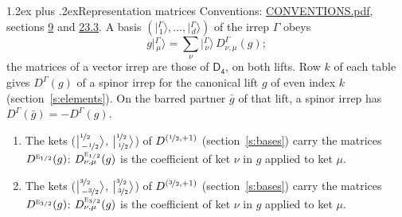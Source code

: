 \documentclass[10pt,a4paper]{article}
\makeatletter
\renewcommand\section{\@startsection{section}{1}{\z@}{-3ex plus -1ex minus -.2ex}%
  {1.2ex plus .2ex}{\normalfont\large\sffamily\bfseries\color{parttitle}}}
\numberwithin{equation}{section}
\newcommand{\grp}[1]{\mathsf{#1}}
\newcommand{\irr}[1]{\text{\normalfont\scshape #1}}
\newcommand{\irrJp}[2]{D^{(#1,#2)}}
\newcommand{\repD}[1]{D^{#1}}
\newcommand{\intx}{\mu}
\newcommand{\jm}[2]{\bigl\lvert{}^{#1}_{\,#2}\bigr\rangle}
\newcommand{\irket}[2]{\bigl\lvert{}^{#1}_{\,#2}\bigr\rangle}
\newcommand{\barred}[1]{\bar{#1}}
\newenvironment{romanlist}{\begin{enumerate}%
\renewcommand{\labelenumi}{(\roman{enumi})}}%
  {\end{enumerate}}
\makeatother
\begin{document}
\section{Representation matrices}\label{s:irrep_matrices}
Conventions: \href{../../CONVENTIONS.pdf}{CONVENTIONS.pdf}, sections \href{../../../rotation/CONVENTIONS.pdf\#conv.9}{9} and \href{../../CONVENTIONS.pdf\#conv.23.3}{23.3}.
\leavevmode\label{n:vector.ket.partner}\label{n:index.partner}\label{n:matrix.irrep}\label{n:index.partner.summed}A basis $(\irket{\Gamma}{1}, \dots, \irket{\Gamma}{d})$ of the irrep $\Gamma$ obeys
\begin{equation}\label{e:partner}g\irket{\Gamma}{\intx} = \sum_\nu \irket{\Gamma}{\nu}\, \repD{\Gamma}_{\nu,\intx}(g);\end{equation}
the matrices of a vector irrep are those of \href{../../../rotation/data/pdf/D4.pdf}{$\grp{D_{4}}$}, on both lifts. Row $k$ of each table gives $\repD{\Gamma}(g)$ of a spinor irrep for the canonical lift $g$ of even index $k$ (section~\ref{s:elements}). On the barred partner $\barred{g}$ of that lift, a spinor irrep has $\repD{\Gamma}(\barred{g}) = -\repD{\Gamma}(g)$.
\begin{romanlist}\raggedright
\item The kets ($\jm{\nicefrac{1}{2}}{-\nicefrac{1}{2}}$, $\jm{\nicefrac{1}{2}}{\nicefrac{1}{2}}$) of $\irrJp{\nicefrac{1}{2}}{+1}$ (section~\ref{s:bases}) carry the matrices $\repD{\irr{e}_{1/2}}(g)$: $\repD{\irr{e}_{1/2}}_{\nu,\intx}(g)$ is the coefficient of ket $\nu$ in $g$ applied to ket $\intx$.
\item The kets ($\jm{\nicefrac{3}{2}}{-\nicefrac{3}{2}}$, $\jm{\nicefrac{3}{2}}{\nicefrac{3}{2}}$) of $\irrJp{\nicefrac{3}{2}}{+1}$ (section~\ref{s:bases}) carry the matrices $\repD{\irr{e}_{3/2}}(g)$: $\repD{\irr{e}_{3/2}}_{\nu,\intx}(g)$ is the coefficient of ket $\nu$ in $g$ applied to ket $\intx$.
\end{romanlist}
\end{document}
